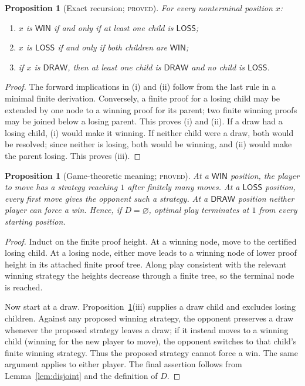 \documentclass[11pt]{article}
\newtheorem{proposition}[theorem]{Proposition}
\theoremstyle{definition}
\newcommand{\Win}{\mathsf{WIN}}
\newcommand{\Loss}{\mathsf{LOSS}}
\newcommand{\Draw}{\mathsf{DRAW}}
\newcommand{\proved}{\textsc{proved}}
\begin{document}
\begin{proposition}[Exact recursion; \proved]\label{prop:recursion}
For every nonterminal position $x$:
\begin{enumerate}
\item[(i)] $x$ is $\Win$ if and only if at least one child is $\Loss$;
\item[(ii)] $x$ is $\Loss$ if and only if both children are $\Win$;
\item[(iii)] if $x$ is $\Draw$, then at least one child is $\Draw$ and no child is
      $\Loss$.
\end{enumerate}
\end{proposition}

\begin{proof}
The forward implications in (i) and (ii) follow from the last rule in a
minimal finite derivation.  Conversely, a finite proof for a losing child may
be extended by one node to a winning proof for its parent; two finite winning
proofs may be joined below a losing parent.  This proves (i) and (ii).
If a draw had a losing child, (i) would make it winning.  If neither child
were a draw, both would be resolved; since neither is losing, both would be
winning, and (ii) would make the parent losing.  This proves (iii).
\end{proof}

\begin{proposition}[Game-theoretic meaning; \proved]\label{prop:strategy}
At a $\Win$ position, the player to move has a strategy reaching $1$ after
finitely many moves.  At a $\Loss$ position, every first move gives the
opponent such a strategy.  At a $\Draw$ position neither player can force a
win.  Hence, if $D=\varnothing$, optimal play terminates at $1$ from every
starting position.
\end{proposition}

\begin{proof}
Induct on the finite proof height.  At a winning node, move to the certified
losing child.  At a losing node, either move leads to a winning node of lower
proof height in its attached finite proof tree.  Along play consistent with
the relevant winning strategy the heights decrease through a finite tree, so
the terminal node is reached.

Now start at a draw.  Proposition~\ref{prop:recursion}(iii) supplies a draw
child and excludes losing children.  Against any proposed winning strategy,
the opponent preserves a draw whenever the proposed strategy leaves a draw;
if it instead moves to a winning child (winning for the new player to move),
the opponent switches to that child's finite winning strategy.  Thus the
proposed strategy cannot force a win.  The same argument applies to either
player.  The final assertion follows from Lemma~\ref{lem:disjoint} and the
definition of $D$.
\end{proof}
\end{document}
